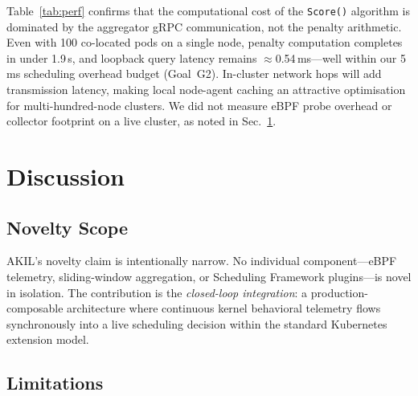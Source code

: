 \documentclass[10pt,conference,a4paper]{IEEEtran}
\begin{document}
Table~\ref{tab:perf} confirms that the computational cost of the \texttt{Score()} algorithm is
dominated by the aggregator gRPC communication, not the penalty arithmetic. Even with 100
co-located pods on a single node, penalty computation completes in under 1.9\,\textmu s, and
loopback query latency remains $\approx$0.54\,ms---well within our 5\,ms scheduling overhead
budget (Goal~G2). In-cluster network hops will add transmission latency, making local node-agent
caching an attractive optimisation for multi-hundred-node clusters. We did not measure eBPF probe
overhead or collector footprint on a live cluster, as noted in Sec.~\ref{sec:discussion}.

\section{Discussion}
\label{sec:discussion}

\subsection{Novelty Scope}

AKIL's novelty claim is intentionally narrow. No individual component---eBPF
telemetry, sliding-window aggregation, or Scheduling Framework plugins---is novel
in isolation. The contribution is the \emph{closed-loop integration}: a
production-composable architecture where continuous kernel behavioral telemetry
flows synchronously into a live scheduling decision within the standard Kubernetes
extension model.

\subsection{Limitations}
\end{document}
